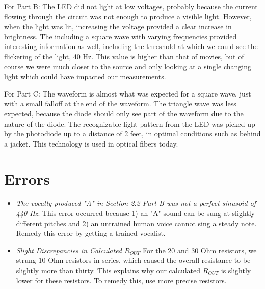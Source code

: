 \documentclass[10pt]{article}
\begin{document}
For Part B: The LED did not light at low voltages, probably because the current flowing through the circuit was not enough to produce a visible light. However, when the light was lit, increasing the voltage provided a clear increase in brightness. The including a square wave with varying frequencies provided interesting information as well, including the threshold at which we could see the flickering of the light, 40 Hz. This value is higher than that of movies, but of course we were much closer to the source and only looking at a single changing light which could have impacted our measurements. 

For Part C: The waveform is almost what was expected for a square wave, just with a small falloff at the end of the waveform. The triangle wave was less expected, because the diode should only see part of the waveform due to the nature of the diode. The recognizable light pattern from the LED was picked up by the photodiode up to a distance of 2 feet, in optimal conditions such as behind a jacket. This technology is used in optical fibers today.

\medskip

\section{Errors}
\begin{itemize}
	\item \textit{The vocally produced "A" in Section 2.2 Part B was not a perfect sinusoid of 440 Hz}: This error occurred because 1) an "A" sound can be sung at slightly different pitches and 2) an untrained human voice cannot sing a steady note. Remedy this error by getting a trained vocalist. 
	\item \textit{Slight Discrepancies in Calculated $R_{OUT}$} For the 20 and 30 Ohm resistors, we strung 10 Ohm resistors in series, which caused the overall resistance to be slightly more than thirty. This explains why our calculated $R_{OUT}$ is slightly lower for these resistors. To remedy this, use more precise resistors. 
\end{itemize}


\medskip

\end{document}
